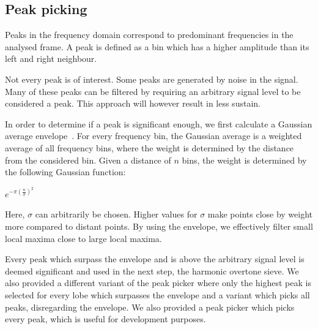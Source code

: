\documentclass[10pt,twocolumn]{article}
\begin{document}
\subsection{Peak picking}
Peaks in the frequency domain correspond to predominant frequencies in the analysed frame. A peak is defined as a bin which has a higher amplitude than its left and right neighbour.

Not every peak is of interest. Some peaks are generated by noise in the signal. Many of these peaks can be filtered by requiring an arbitrary signal level to be considered a peak. This approach will however result in less sustain.

In order to determine if a peak is significant enough, we first calculate a Gaussian average envelope~\cite{gauss}. For every frequency bin, the Gaussian average is a weighted average of all frequency bins, where the weight is determined by the distance from the considered bin. Given a distance of $n$ bins, the weight is determined by the following Gaussian function:
\begin{center}
    $e^{-\pi(\frac{n}{\sigma})^2}$
\end{center}
Here, $\sigma$ can arbitrarily be chosen. Higher values for $\sigma$ make points close by weight more compared to distant points. By using the envelope, we effectively filter small local maxima close to large local maxima.

Every peak which surpass the envelope and is above the arbitrary signal level is deemed significant and used in the next step, the harmonic overtone sieve. We also provided a different variant of the peak picker where only the highest peak is selected for every lobe which surpasses the envelope and a variant which picks all peaks, disregarding the envelope. We also provided a peak picker which picks every peak, which is useful for development purposes.
\end{document}
